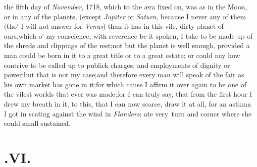 \documentclass{article}
\begin{document}
 the fifth day of \textit{November},
1718, which to the æra fixed on, was as\break 
{}
\break
{}
in the Moon, or in any of the
planets, (except \textit{Jupiter} or \textit{Saturn}, because I never
 any of them (tho’ I will not answer for \textit{Venus})
than it has in this vile, dirty pla\-net of ours,\tsk which
o’ my conscience, with reverence be it spoken, I take to be
made up of the shreds and clippings of the rest;\tsh not
but the planet is well enough, provided a man could be born in it
to a great title or to a great estate; or could any how contrive to
be called up to publick charges, and employments of dignity or
power;\tsh but that is not my case;\tsh and
therefore every man will speak of the fair as his own market has
gone in it;\tsk for which cause I affirm it over
again to be one of the vilest worlds that ever was made;\tsk for
I can truly say, that from the first hour I drew my breath in it,
to this, that I can now scarce, draw it at all, for an asthma I got
in scating against the wind in \textit{Flanders};\tsk\break
{}
ate very\sic\ turn and corner where she could 
small  sustained.

\null
\section{.\enspace VI.}
\end{document}
